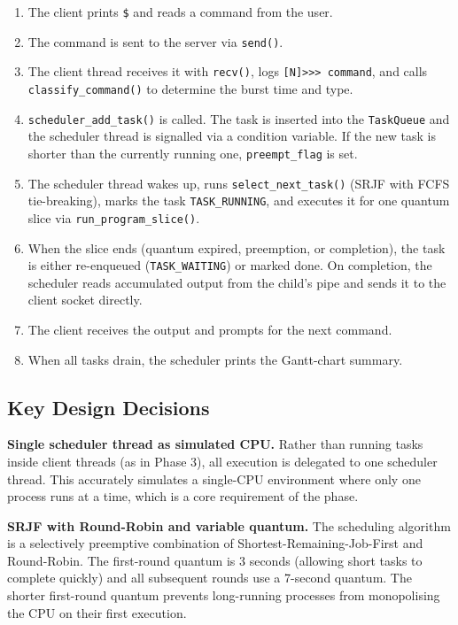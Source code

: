 \documentclass[12pt]{article}
\begin{document}
\begin{enumerate}
    \item The client prints \texttt{\$} and reads a command from the user.
    \item The command is sent to the server via \texttt{send()}.
    \item The client thread receives it with \texttt{recv()}, logs
          \texttt{[N]>>> command}, and calls \texttt{classify\_command()} to determine
          the burst time and type.
    \item \texttt{scheduler\_add\_task()} is called. The task is inserted into the
          \texttt{TaskQueue} and the scheduler thread is signalled via a condition
          variable. If the new task is shorter than the currently running one,
          \texttt{preempt\_flag} is set.
    \item The scheduler thread wakes up, runs \texttt{select\_next\_task()} (SRJF with
          FCFS tie-breaking), marks the task \texttt{TASK\_RUNNING}, and executes it for
          one quantum slice via \texttt{run\_program\_slice()}.
    \item When the slice ends (quantum expired, preemption, or completion), the task is
          either re-enqueued (\texttt{TASK\_WAITING}) or marked done. On completion, the
          scheduler reads accumulated output from the child's pipe and sends it to the
          client socket directly.
    \item The client receives the output and prompts for the next command.
    \item When all tasks drain, the scheduler prints the Gantt-chart summary.
\end{enumerate}

\subsection{Key Design Decisions}

\textbf{Single scheduler thread as simulated CPU.} Rather than running tasks inside
client threads (as in Phase 3), all execution is delegated to one scheduler thread. This
accurately simulates a single-CPU environment where only one process runs at a time, which
is a core requirement of the phase.

\textbf{SRJF with Round-Robin and variable quantum.} The scheduling algorithm is a
selectively preemptive combination of Shortest-Remaining-Job-First and Round-Robin. The
first-round quantum is 3 seconds (allowing short tasks to complete quickly) and all
subsequent rounds use a 7-second quantum. The shorter first-round quantum prevents
long-running processes from monopolising the CPU on their first execution.
\end{document}
